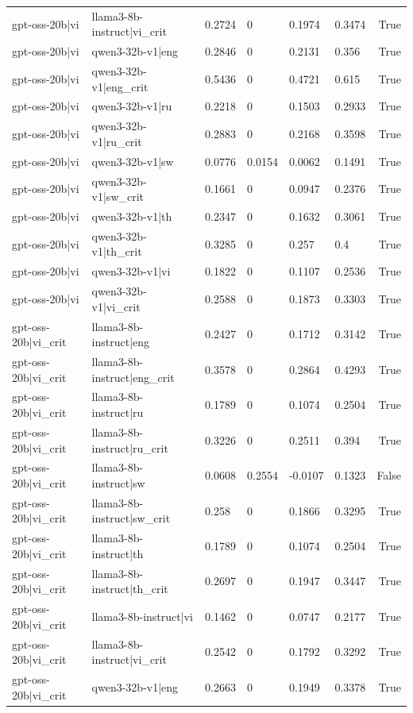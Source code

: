 \begin{table}
\begin{tabular}{llllllr}
gpt-oss-20b|vi & llama3-8b-instruct|vi_crit & 0.2724 & 0 & 0.1974 & 0.3474 & True \\
gpt-oss-20b|vi & qwen3-32b-v1|eng & 0.2846 & 0 & 0.2131 & 0.356 & True \\
gpt-oss-20b|vi & qwen3-32b-v1|eng_crit & 0.5436 & 0 & 0.4721 & 0.615 & True \\
gpt-oss-20b|vi & qwen3-32b-v1|ru & 0.2218 & 0 & 0.1503 & 0.2933 & True \\
gpt-oss-20b|vi & qwen3-32b-v1|ru_crit & 0.2883 & 0 & 0.2168 & 0.3598 & True \\
gpt-oss-20b|vi & qwen3-32b-v1|sw & 0.0776 & 0.0154 & 0.0062 & 0.1491 & True \\
gpt-oss-20b|vi & qwen3-32b-v1|sw_crit & 0.1661 & 0 & 0.0947 & 0.2376 & True \\
gpt-oss-20b|vi & qwen3-32b-v1|th & 0.2347 & 0 & 0.1632 & 0.3061 & True \\
gpt-oss-20b|vi & qwen3-32b-v1|th_crit & 0.3285 & 0 & 0.257 & 0.4 & True \\
gpt-oss-20b|vi & qwen3-32b-v1|vi & 0.1822 & 0 & 0.1107 & 0.2536 & True \\
gpt-oss-20b|vi & qwen3-32b-v1|vi_crit & 0.2588 & 0 & 0.1873 & 0.3303 & True \\
gpt-oss-20b|vi_crit & llama3-8b-instruct|eng & 0.2427 & 0 & 0.1712 & 0.3142 & True \\
gpt-oss-20b|vi_crit & llama3-8b-instruct|eng_crit & 0.3578 & 0 & 0.2864 & 0.4293 & True \\
gpt-oss-20b|vi_crit & llama3-8b-instruct|ru & 0.1789 & 0 & 0.1074 & 0.2504 & True \\
gpt-oss-20b|vi_crit & llama3-8b-instruct|ru_crit & 0.3226 & 0 & 0.2511 & 0.394 & True \\
gpt-oss-20b|vi_crit & llama3-8b-instruct|sw & 0.0608 & 0.2554 & -0.0107 & 0.1323 & False \\
gpt-oss-20b|vi_crit & llama3-8b-instruct|sw_crit & 0.258 & 0 & 0.1866 & 0.3295 & True \\
gpt-oss-20b|vi_crit & llama3-8b-instruct|th & 0.1789 & 0 & 0.1074 & 0.2504 & True \\
gpt-oss-20b|vi_crit & llama3-8b-instruct|th_crit & 0.2697 & 0 & 0.1947 & 0.3447 & True \\
gpt-oss-20b|vi_crit & llama3-8b-instruct|vi & 0.1462 & 0 & 0.0747 & 0.2177 & True \\
gpt-oss-20b|vi_crit & llama3-8b-instruct|vi_crit & 0.2542 & 0 & 0.1792 & 0.3292 & True \\
gpt-oss-20b|vi_crit & qwen3-32b-v1|eng & 0.2663 & 0 & 0.1949 & 0.3378 & True \\

\end{tabular}
\end{table}
